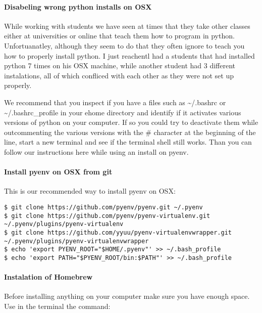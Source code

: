 \paragraph{Disabeling wrong python installs on
OSX}\label{disabeling-wrong-python-installs-on-osx}

While working with students we have seen at times that they take other
classes either at universities or online that teach them how to program
in python. Unfortuanatley, although they seem to do that they often
ignore to teach you how to properly install python. I just reachentl had
a students that had installed python 7 times on his OSX machine, while
another student had 3 different instalations, all of which confliced
with each other as they were not set up properly.

We recommend that you inspect if you have a files such as
\textasciitilde{}/.bashrc or \textasciitilde{}/.bashrc\_profile in your
ehome directory and identify if it activates various versions of python
on your computer. If so you could try to deactivate them while
outcommenting the various versions with the \# character at the
beginning of the line, start a new terminal and see if the terminal
shell still works. Than you can follow our instructions here while using
an install on pyenv.

\paragraph{Install pyenv on OSX from
git}\label{install-pyenv-on-osx-from-git}

This is our recommended way to install pyenv on OSX:

\begin{verbatim}
$ git clone https://github.com/pyenv/pyenv.git ~/.pyenv
$ git clone https://github.com/pyenv/pyenv-virtualenv.git ~/.pyenv/plugins/pyenv-virtualenv
$ git clone https://github.com/yyuu/pyenv-virtualenvwrapper.git ~/.pyenv/plugins/pyenv-virtualenvwrapper
$ echo 'export PYENV_ROOT="$HOME/.pyenv"' >> ~/.bash_profile
$ echo 'export PATH="$PYENV_ROOT/bin:$PATH"' >> ~/.bash_profile
\end{verbatim}

\paragraph{Instalation of Homebrew}\label{instalation-of-homebrew}

Before installing anything on your computer make sure you have enough
space. Use in the terminal the command:

